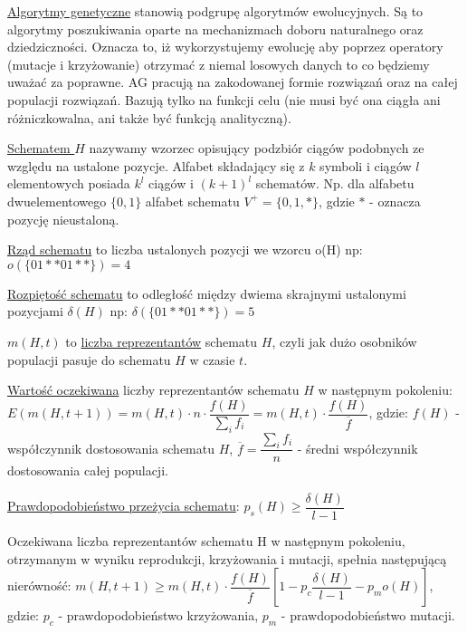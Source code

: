 \underline{Algorytmy genetyczne} stanowią podgrupę algorytmów ewolucyjnych. Są to algorytmy poszukiwania oparte na mechanizmach doboru naturalnego oraz dziedziczności. Oznacza to, iż wykorzystujemy ewolucję aby poprzez operatory (mutacje i krzyżowanie) otrzymać z niemal losowych danych to co będziemy uważać za poprawne. AG pracują na zakodowanej formie rozwiązań oraz na całej populacji rozwiązań. Bazują tylko na funkcji celu (nie musi być ona ciągła ani różniczkowalna, ani także być funkcją analityczną).

\underline{Schematem $ H $} nazywamy wzorzec opisujący podzbiór ciągów podobnych ze względu na ustalone pozycje. Alfabet składający się z $ k $ symboli i ciągów $ l $ elementowych posiada $ k^l $ ciągów i $ (k+1)^l $ schematów. Np. dla alfabetu dwuelementowego $ \{0, 1\} $ alfabet schematu $ V^+ = \{0, 1, *\} $, gdzie $ * $ - oznacza pozycję nieustaloną.

\underline{Rząd schematu} to liczba ustalonych pozycji we wzorcu o(H) np:\newline
$ o(\{01**01**\}) = 4 $

\underline{Rozpiętość schematu} to odległość między dwiema skrajnymi ustalonymi pozycjami $ \delta (H) $ np:\newline
$ \delta(\{01**01**\}) = 5 $

$ m(H, t) $ to \underline{liczba reprezentantów} schematu $ H $, czyli jak dużo osobników populacji pasuje do schematu $ H $ w czasie $ t $.

\underline{Wartość oczekiwana} liczby reprezentantów schematu $ H $ w następnym pokoleniu:\newline
$ E(m(H, t+1)) = m(H, t)\cdot n \cdot \dfrac{f(H)}{\sum_i f_i} = m(H, t) \cdot \dfrac{f(H)}{\overline{f}} $, gdzie:\newline
$ f(H) $ - współczynnik dostosowania schematu $ H $,\newline
$ \overline{f} = \dfrac{\sum_i f_i}{n} $ - średni współczynnik dostosowania całej populacji.

\underline{Prawdopodobieństwo przeżycia schematu}:\newline
$ p_s(H) \geq \dfrac{\delta (H)}{l-1} $

Oczekiwana liczba reprezentantów schematu H w następnym pokoleniu, otrzymanym w wyniku reprodukcji, krzyżowania i mutacji, spełnia następującą nierówność:\newline
$ m(H, t+1) \geq m(H, t) \cdot \dfrac{f(H)}{\overline{f}} [1 - p_c \dfrac{\delta (H)}{l-1} - p_m o(H)] $, gdzie: \newline
$ p_c $ - prawdopodobieństwo krzyżowania,\newline
$ p_m $ - prawdopodobieństwo mutacji.

